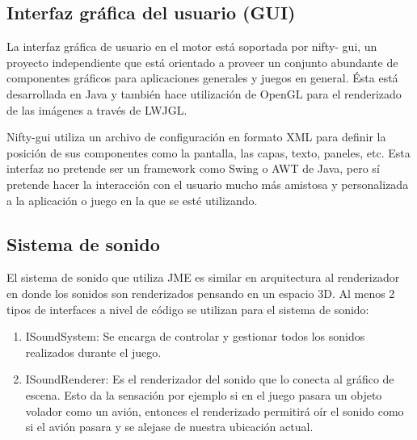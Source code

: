 \documentclass[a4paper,12pt,openany,oneside]{book}
\begin{document}
\subsection{Interfaz gráfica del usuario (GUI)}
La interfaz gráfica de usuario en el motor está soportada por nifty- gui, un proyecto independiente que está orientado a proveer un conjunto abundante de componentes gráficos para aplicaciones generales y juegos en general. Ésta está desarrollada en Java y también hace utilización de OpenGL para el renderizado de las imágenes a través de LWJGL.

Nifty-gui utiliza un archivo de configuración en formato XML para definir la posición de sus componentes como la pantalla, las capas, texto, paneles, etc. Esta interfaz no pretende ser un framework como Swing o AWT de Java, pero sí pretende hacer la interacción con el usuario mucho más amistosa y personalizada a la aplicación o juego en la que se esté utilizando. 
\subsection{Sistema de sonido}
El sistema de sonido que utiliza JME es similar en arquitectura al renderizador en donde los sonidos son renderizados pensando en un espacio 3D. Al menos 2 tipos de interfaces a nivel de código se utilizan para el sistema de sonido:
\begin{enumerate}
\item ISoundSystem: Se encarga de controlar y gestionar todos los sonidos realizados durante el juego. 
\item ISoundRenderer: Es el renderizador del sonido que lo conecta al gráfico de escena. Esto da la sensación por ejemplo si en el juego pasara un objeto volador como un avión, entonces el renderizado permitirá oír el sonido como si el avión pasara y se alejase de nuestra ubicación actual. 
\end{enumerate}
\end{document}
